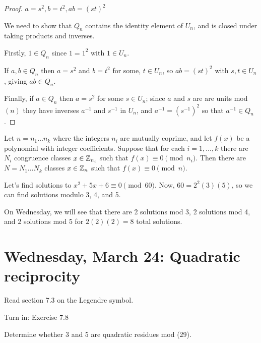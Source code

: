 \documentclass[letterpaper, 11 pt]{article}
\begin{document}
\begin{proof}
 $a=s^2, b=t^2, ab=(st)^2$
 
We need to show that $Q_n$ contains the identity element of $U_n$, and is closed under taking products and inverses. 

Firstly, $1 \in Q_n$ since $1 = 1^2$ with $1 \in U_n$. 

If $a,b\in Q_n$ then $a=s^2$ and $b=t^2$ for some, $t\in U_n$, so $ab=(st)^2$ with $s,t \in U_n$, giving $ab \in Q_n$. 

Finally, if $a\in Q_n$ then $a = s^2$ for some $s \in U_n$; since $a$ and $s$ are are units mod $(n)$ they have inverses $a^{-1}$ and $s^{-1}$ in $U_n$, and $a^{-1} = (s^{-1})^2$ so that $a^{-1}\in Q_n$.
\end{proof}

\begin{thm}[Theorem 3.11] 
Let $n = n_1 \dots n_k$ where the integers $n_i$ are mutually coprime, and let $f(x)$ be a polynomial with integer coefficients. Suppose that for each $i = 1, \dots , k$ there are $N_i$ congruence classes $x \in\mathbb Z_{n_i}$ such that $f(x) \equiv 0 \pmod{n_i}$. Then there are $N = N_1 \dots N_k$ classes $x \in \mathbb Z_n$ such that $f(x) \equiv0\pmod n.$
\end{thm}

\begin{example} Let's find solutions to
$x^2+5x+6\equiv0 \pmod{60}$. Now, $60=2^2(3)(5)$, so we can find solutions modulo 3, 4, and 5.

On Wednesday, we will see that there are 2 solutions mod 3, 2 solutions mod 4, and 2 solutions mod 5 for $2(2)(2)=8$ total solutions.
\end{example}

\section{Wednesday, March 24: Quadratic reciprocity}
Read section 7.3 on the Legendre symbol. 

Turn in: Exercise 7.8 

Determine whether 3 and 5 are quadratic residues mod (29).
\end{document}
